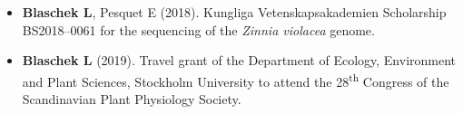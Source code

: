 \documentclass[11pt]{article}
\begin{document}
\vspace{-0.175cm}
\begin{itemize}[label={},itemindent=-9pt,leftmargin=24pt]
	\itemsep-0.1cm
	\item \textbf{Blaschek L}, Pesquet E (2018). Kungliga Vetenskapsakademien Scholarship BS2018--0061 for the sequencing of the \textit{Zinnia violacea} genome. 
	\item \textbf{Blaschek L} (2019). Travel grant of the Department of Ecology, Environment and Plant Sciences, Stockholm University to attend the 28\textsuperscript{th} Congress of the Scandinavian Plant Physiology Society.
\end{itemize}
\newpage
\end{document}
